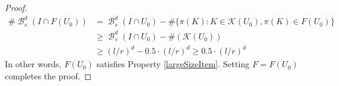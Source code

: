 \documentclass[dvipsnames,letterpaper,12pt]{article}
\numberwithin{equation}{section}
\theoremstyle{plain}
\theoremstyle{remark}
\DeclareMathOperator{\B}{\mathcal{B}}
\begin{document}
\begin{proof}
	\begin{align*}
		\# \B_s^d(I \cap F(U_0)) &= \B_s^d(I \cap U_0) - \# \{ \pi(K) : K \in \mathcal{K}(U_0), \pi(K) \in F(U_0) \}\\
		&\geq \B_s^d(I \cap U_0) - \#(\mathcal{K}(U_0))\\
		&\geq (l/r)^d - 0.5 \cdot (l/r)^d \geq 0.5 \cdot (l/r)^d
	\end{align*}  
	In other words, $F(U_0)$ satisfies Property \ref{largeSizeItem}. Setting $F = F(U_0)$ completes the proof.
\end{proof}
\end{document}
